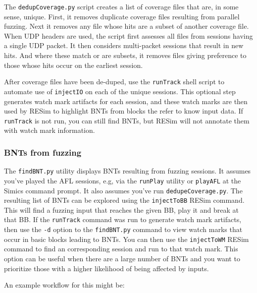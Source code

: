\documentclass[titlepage]{article}
\begin{document}
The {\tt dedupCoverage.py} script creates a list of coverage files that are, in some sense, unique.  First, it removes duplicate coverage files resulting from
parallel fuzzing.  Next it removes any file whose hits are a subset of another coverage file.  When UDP headers are used, the script first assesses all files from
sessions having a single UDP packet.  It then considers multi-packet sessions that result in new hits.  And where these match or are subsets, it removes files 
giving preference to those whose hits occur on the earliest session.

After coverage files have been de-duped, use the {\tt runTrack} shell script to automate use of {\tt injectIO} on each of the unique sessions.  This optional step
generates watch mark artifacts for each session, and these watch marks are then used by RESim to highlight BNTs from blocks the refer to know input data.  If {\tt runTrack}
is not run, you can still find BNTs, but RESim will not annotate them with watch mark information.

\subsubsection{BNTs from fuzzing}
\label{BNT-fuzz}
The {\tt findBNT.py} utility displays BNTs resulting from fuzzing sessions.  It assumes you've played the AFL sessions, e.g, via the {\tt runPlay} utility or {\tt playAFL}
at the Simics command prompt.  It also assumes you've run {\tt dedupeCoverage.py}.  The resulting list of BNTs can be explored using the {\tt injectToBB}
RESim command.  This will find a fuzzing input that reaches the given BB, play it and break at that BB.  If the {\tt runTrack} command was run to generate watch mark
artifacts, then use the {\tt -d} option to the {\tt findBNT.py} command to view watch marks that occur in basic blocks leading to BNTs.  You can then use the
{\tt injectToWM} RESim command to find an corresponding session and run to that watch mark.  This option can be useful when there are a large number
of BNTs and you want to prioritize those with a higher likelihood of being affected by inputs.

An example workflow for this might be:
\end{document}
